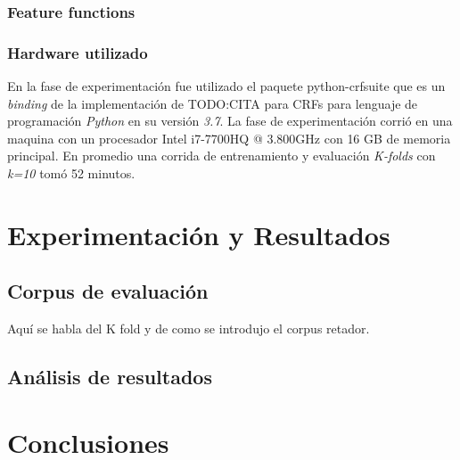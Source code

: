 \documentclass[letterpaper,12pt,oneside]{book}
\theoremstyle{definition}
\begin{document}
	
	
	\subsection{Feature functions}

	
	\subsection{Hardware utilizado}

	
	En la fase de experimentación fue utilizado el paquete \textsf{python-crfsuite} que es un \textit{binding} de la implementación de TODO:CITA para CRFs para lenguaje de programación \textit{Python} en su versión \textit{3.7}. La fase de experimentación corrió en una maquina con un procesador \textsf{Intel i7-7700HQ @ 3.800GHz} con \textsf{16 GB} de memoria principal. En promedio una corrida de entrenamiento y evaluación \textit{K-folds} con \textit{k=10} tomó 52 minutos.

	

	
	\chapter{Experimentación y Resultados}

	
	







	
	\section{Corpus de evaluación}

	
	Aquí se habla del K fold y de como se introdujo el corpus retador.

	
	\section{Análisis de resultados}

	
	\chapter{Conclusiones}

	
	

	
\end{document}
